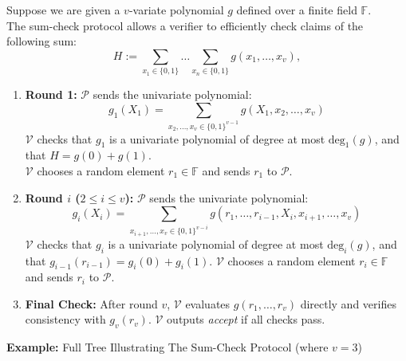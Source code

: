 Suppose we are given a $v$-variate polynomial $g$ defined over a finite field $\mathbb{F}$. \\
The sum-check protocol allows a verifier to efficiently check claims of the following sum: 
$$
H := \sum_{x_1 \in \{0,1\}} \dots \sum_{x_n \in \{0,1\}} g(x_1, \dots, x_v),
$$ 

\begin{protocol}
\begin{enumerate}
  \item \textbf{Round 1:} \(\mathcal{P}\) sends the univariate polynomial:
  \[
    g_1(X_1) = \sum_{x_2,\dots,x_v \in \{0,1\}^{v-1}} g(X_1,x_2,\dots,x_v)
  \]
  \(\mathcal{V}\) checks that $g_1$ is a univariate polynomial of degree at most $\text{deg}_1(g)$, and that $H = g(0) + g(1)$. \\
  \(\mathcal{V}\) chooses a random element $r_1 \in \mathbb{F}$ and sends $r_1$ to $\mathcal{P}$.
  \item \textbf{Round \(i\) (\(2 \le i \le v\)):} \(\mathcal{P}\) sends the univariate polynomial:
  \[
    g_i(X_i) = \sum_{x_{i+1},\dots,x_v \in \{0,1\}^{v-i}} g(r_1, \dots, r_{i-1}, X_i, x_{i+1}, \dots, x_v)
  \]
   \(\mathcal{V}\) checks that $g_i$ is a univariate polynomial of degree at most $\text{deg}_i(g)$, and that $g_{i-1}(r_{i-1}) = g_i(0) + g_i(1)$. \(\mathcal{V}\) chooses a random element $r_i \in \mathbb{F}$ and sends $r_i$ to $\mathcal{P}$.
  \item \textbf{Final Check:} After round \(v\), \(\mathcal{V}\) evaluates \(g(r_1, \dots, r_v)\) directly and verifies consistency with \(g_v(r_v)\). \(\mathcal{V}\) outputs \emph{accept} if all checks pass.
\end{enumerate}
\end{protocol}

\myspace
\myspace

\noindent \textbf{Example:} Full Tree Illustrating The Sum-Check Protocol (where $v = 3$)

\myspace
\myspace

\noindent {}

